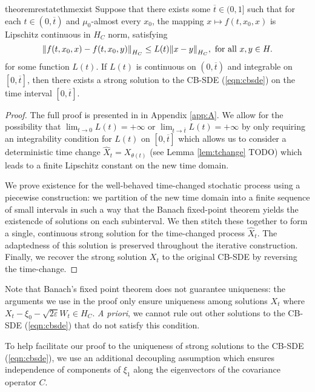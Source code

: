 \begin{restatable}{theorem}{restatethmexist} \label{thm:exist}
  Suppose that there exists some \(\overline{t} \in (0, 1]\) such that for each \(t \in (0, \overline{t})\) and \(\mu_{0}\)-almost every \(x_{0}\), the mapping \(x \mapsto f(t, x_{0}, x)\) is Lipschitz continuous in \(H_{C}\) norm, satisfying
  \[
    \norm{f(t, x_{0}, x) - f(t, x_{0}, y)}_{H_{C}} \leq L(t) \norm{x - y}_{H_{C}}, \text{ for all } x, y \in H.
  \]
  for some function \(L(t)\). If \(L(t)\) is continuous on \((0, \overline{t})\) and integrable on \([0, \overline{t}]\), then there exists a strong solution to the CB-SDE (\ref{eqn:cbsde}) on the time interval \([0, \overline{t}]\).
\end{restatable}
\begin{proof}
  The full proof is presented in  in Appendix \ref{app:A}. We allow for the possibility that \(\lim_{t \to 0} L(t) = +\infty\) or \(\lim_{t \to \overline{t}} L(t) = +\infty \) by only requiring an integrability condition for \(L(t)\) on \([0, \overline{t}]\) which allows us to consider a deterministic time change \(\hat{X}_{t} = X_{\theta(t)}\) (see Lemma \ref{lem:tchange} TODO) which leads to a finite Lipschitz constant on the new time domain.

  We prove existence for the well-behaved time-changed stochatic process using a piecewise construction: we partition of the new time domain into a finite sequence of small intervals in such a way that the Banach fixed-point theorem  yields the existencde of solutions on each subinterval. We then stitch these together to form a single, continuous strong solution for the time-changed process \(\hat{X}_{t}\). The adaptedness of this solution is preserved throughout the iterative construction. Finally, we recover the strong solution \(X_{t}\) to the original CB-SDE by reversing the time-change.
\end{proof}

Note that Banach's fixed point theorem does not guarantee uniqueness: the arguments we use in the proof only ensure uniqueness among solutions \(X_{t}\) where \(X_{t} - \xi_{0} - \sqrt{2\varepsilon} W_{t} \in H_{C}\). \textit{A priori}, we cannot  rule out  other solutions to the CB-SDE (\ref{eqn:cbsde}) that do not satisfy this condition.

To help facilitate our proof to the uniqueness of strong solutions to the CB-SDE (\ref{eqn:cbsde}), we use an additional decoupling assumption which ensures independence of components of \(\xi_{1}\) along the eigenvectors of the covariance operator \(C\).

